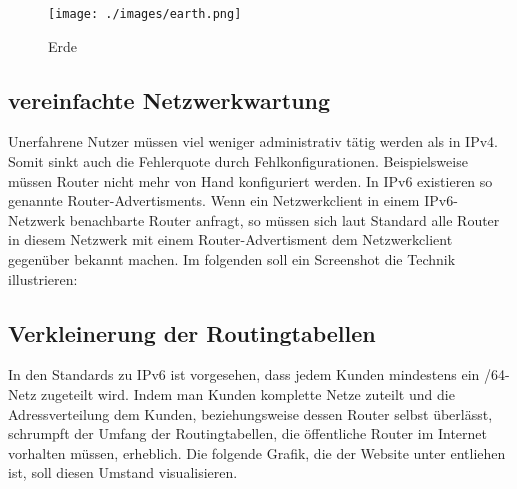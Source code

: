 \documentclass[a4paper,12pt]{scrartcl}
\begin{document}
\clearpage

\begin{figure}[htb]
\begin{center}
 \texttt{[image: ./images/earth.png]}
 \end{center}
\caption[Erde, Quelle: Autor,]{\label{earth}Erde}
\end{figure}

\subsection{vereinfachte Netzwerkwartung}

Unerfahrene Nutzer m\"ussen viel weniger administrativ t\"atig werden als in IPv4. Somit sinkt auch die Fehlerquote durch Fehlkonfigurationen. Beispielsweise m\"ussen Router nicht mehr von Hand konfiguriert werden. In IPv6 existieren so genannte Router-Advertisments. Wenn ein Netzwerkclient in einem IPv6-Netzwerk benachbarte Router anfragt, so m\"ussen sich laut Standard alle Router in diesem Netzwerk mit einem Router-Advertisment dem Netzwerkclient gegen\"uber bekannt machen. Im folgenden soll ein Screenshot die Technik illustrieren:



\subsection{Verkleinerung der Routingtabellen}
In den Standards zu IPv6 ist vorgesehen, dass jedem Kunden mindestens ein /64-Netz zugeteilt wird. Indem man Kunden komplette Netze zuteilt und die Adressverteilung dem Kunden, beziehungsweise dessen Router selbst überlässt, schrumpft der Umfang der Routingtabellen, die öffentliche Router im Internet vorhalten müssen, erheblich. Die folgende Grafik, die der Website unter \cite{ipv4v6map} entliehen ist, soll diesen Umstand visualisieren.
\end{document}
